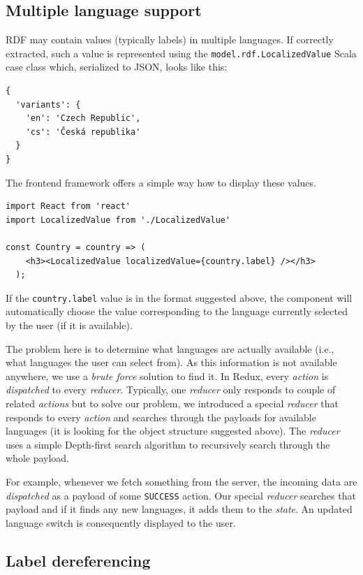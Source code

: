 \subsection{Multiple language support}

RDF may contain values (typically labels) in multiple languages. If correctly extracted, such a value is represented using the \texttt{model.rdf.LocalizedValue} Scala case class which, serialized to JSON, looks like this:

\begin{verbatim}
{
  'variants': {
    'en': 'Czech Republic',
    'cs': 'Česká republika'
  }
}
\end{verbatim}

The frontend framework offers a simple way how to display these values.

\begin{verbatim}
import React from 'react'
import LocalizedValue from './LocalizedValue'

const Country = country => (
    <h3><LocalizedValue localizedValue={country.label} /></h3>
  );
\end{verbatim}

If the \texttt{country.label} value is in the format suggested above, the component will automatically choose the value corresponding to the language currently selected by the user (if it is available).

The problem here is to determine what languages are actually available (i.e., what languages the user can select from). As this information is not available anywhere, we use a \emph{brute force} solution to find it. In Redux, every \emph{action} is \emph{dispatched} to every \emph{reducer}. Typically, one \emph{reducer} only responds to couple of related \emph{actions} but to solve our problem, we introduced a special \emph{reducer} that responds to every \emph{action} and searches through the payloads for available languages (it is looking for the object structure suggested above). The \emph{reducer} uses a simple Depth-first search algorithm to recursively search through the whole payload.

For example, whenever we fetch something from the server, the incoming data are \emph{dispatched} as a payload of some \texttt{SUCCESS} action. Our special \emph{reducer} searches that payload and if it finds any new languages, it adds them to the \emph{state}. An updated language switch is consequently displayed to the user.

\subsection{Label dereferencing}
\label{sec:implementation:advanced-features:label-dereferencering}

